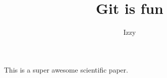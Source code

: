 \documentclass[10pt]{article}
\author{Izzy}\title{Git is fun}
\begin{document}
	\maketitle

	This is a super awesome scientific paper.
\end{document}
